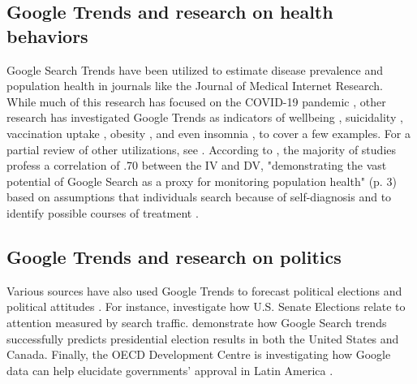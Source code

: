 \subsection{Google Trends and research on health behaviors}

Google Search Trends have been utilized to estimate disease prevalence
and population health in journals like the Journal of
Medical Internet Research. While much of this research has focused on
the COVID-19 pandemic \citep{jimenez_etal20, jimenezCOVID19SymptomGoogle2020, limEstimatingInformationSeekingBehaviour2020, mavraganiCOVID19PredictabilityUnited2020, nguyenGoogleTrendsAnalysis2020, todorovaInternetBasedData2021, mingUnderstandingHealthCommunication2021},
other research has investigated Google Trends as indicators of wellbeing
\citep{brodeurCOVID19LockdownsWellbeing2021, carpiTwitterSubjectiveWellBeing2020, duCOVID19IncreasesOnline2020},
suicidality \citep{burnettTimeTrendsPublic2020}, 
vaccination uptake \citep{dalumhansenEnsembleLearnedVaccination2016}, 
obesity \citep{sarigulNowcastingObesityUsing2014}, 
and even insomnia \citep{zittingGoogleTrendsReveal2020},
to cover a few examples. For a partial review of other utilizations, see \citet{nutiUseGoogleTrends2014}. According to \citet{jaidkaInformationseekingVsSharing2021}, the majority of studies profess
a correlation of \> .70 between the IV and DV, "demonstrating the vast potential of Google
Search as a proxy for monitoring population health" (p. 3) based on
assumptions that individuals search because of self-diagnosis and to
identify possible courses of treatment \citep{dechoudhurySeekingSharingHealth2014}.


\subsection{Google Trends and research on politics}

Various sources have also used Google Trends to forecast
political elections and political attitudes
\citep{wolfTrendingRightDirection2018}. For instance,
\citet{swearingenGoogleInsightsSenate2014} investigate how U.S. Senate
Elections relate to attention measured by search traffic.
\citet{prado-romanGoogleTrendsPredictor2020} demonstrate how Google Search trends
successfully predicts presidential election results in both the United
States and Canada. Finally, the OECD Development Centre is investigating
how Google data can help elucidate governments' approval in Latin
America \citep{montoyaUsingGoogleData2020}. 

